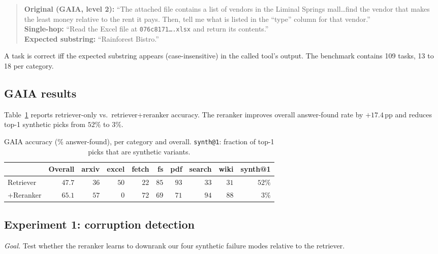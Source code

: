 \begin{quote}\small
\textbf{Original (GAIA, level 2):} ``The attached file contains a list of vendors in the Liminal Springs mall\ldots find the vendor that makes the least money relative to the rent it pays. Then, tell me what is listed in the ``type'' column for that vendor.''\\[4pt]
\textbf{Single-hop:} ``Read the Excel file at \texttt{076c8171\ldots.xlsx} and return its contents.''\\
\textbf{Expected substring:} ``Rainforest Bistro.''
\end{quote}

A task is correct iff the expected substring appears (case-insensitive) in the called tool's output. The benchmark contains 109 tasks, 13 to 18 per category.

\subsection{GAIA results}

Table~\ref{tab:gaia-results} reports retriever-only vs.\ retriever+reranker accuracy. The reranker improves overall answer-found rate by $+17.4$\,pp and reduces top-1 synthetic picks from $52\%$ to $3\%$.

\begin{table}[h]
\centering
\small
\begin{tabular}{lrrrrrrrrr}
\toprule
 & Overall & arxiv & excel & fetch & fs & pdf & search & wiki & synth@1 \\
\midrule
Retriever        & $47.7$ & $36$ & $50$ & $22$ & $85$ & $93$ & $33$ & $31$ & $52\%$ \\
+Reranker        & $\mathbf{65.1}$ & $57$ & $0$ & $72$ & $69$ & $71$ & $94$ & $88$ & $3\%$ \\
\bottomrule
\end{tabular}
\caption{GAIA accuracy (\% answer-found), per category and overall. \texttt{synth@1}: fraction of top-1 picks that are synthetic variants.}
\label{tab:gaia-results}
\end{table}

\subsection{Experiment 1: corruption detection}
\label{sec:exp1}

\textit{Goal.} Test whether the reranker learns to downrank our four synthetic failure modes relative to the retriever.

